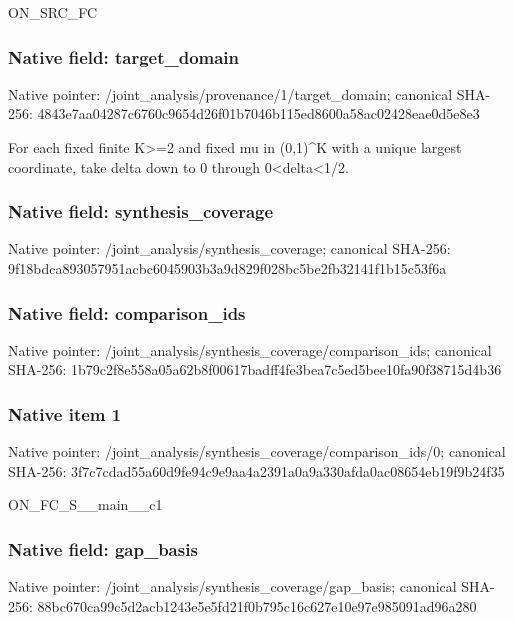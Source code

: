\documentclass[10pt,a4paper]{article}
\begin{document}
\begingroup\raggedright\sloppy ON\_\allowbreak{}SRC\_\allowbreak{}FC\par\endgroup

\subsubsection{Native field: target\_\allowbreak{}domain}
Native pointer: /joint\_\allowbreak{}analysis/provenance/1/target\_\allowbreak{}domain; canonical SHA-256: 4843e7aa04287c6760c9654d26f01b7046b115ed8600a58ac02428eae0d5e8e3

\begingroup\raggedright\sloppy For each fixed finite K>=\allowbreak{}2 and fixed mu in (0,\allowbreak{}1)\textasciicircum{}K with a unique largest coordinate,\allowbreak{} take delta down to 0 through 0<delta<1/\allowbreak{}2.\par\endgroup

\subsubsection{Native field: synthesis\_\allowbreak{}coverage}
Native pointer: /joint\_\allowbreak{}analysis/synthesis\_\allowbreak{}coverage; canonical SHA-256: 9f18bdca893057951acbc6045903b3a9d829f028bc5be2fb32141f1b15c53f6a

\subsubsection{Native field: comparison\_\allowbreak{}ids}
Native pointer: /joint\_\allowbreak{}analysis/synthesis\_\allowbreak{}coverage/comparison\_\allowbreak{}ids; canonical SHA-256: 1b79c2f8e558a05a62b8f00617badff4fe3bea7c5ed5bee10fa90f38715d4b36

\subsubsection{Native item 1}
Native pointer: /joint\_\allowbreak{}analysis/synthesis\_\allowbreak{}coverage/comparison\_\allowbreak{}ids/0; canonical SHA-256: 3f7c7cdad55a60d9fe94c9e9aa4a2391a0a9a330afda0ac08654eb19f9b24f35

\begingroup\raggedright\sloppy ON\_\allowbreak{}FC\_\allowbreak{}S\_\allowbreak{}\_\allowbreak{}main\_\allowbreak{}\_\allowbreak{}c1\par\endgroup

\subsubsection{Native field: gap\_\allowbreak{}basis}
Native pointer: /joint\_\allowbreak{}analysis/synthesis\_\allowbreak{}coverage/gap\_\allowbreak{}basis; canonical SHA-256: 88bc670ca99c5d2acb1243e5e5fd21f0b795c16c627e10e97e985091ad96a280
\end{document}
